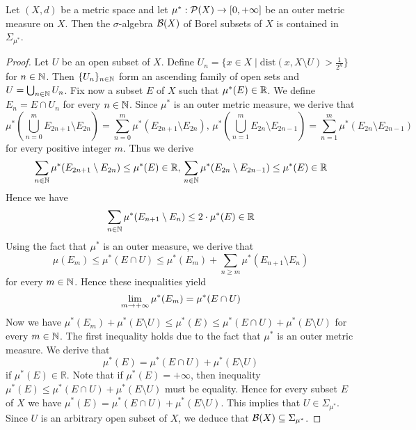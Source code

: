 \begin{theorem}
Let $(X,d)$ be a metric space and let $\mu^*:{\mathcal P}(X)\rightarrow [0,+\infty]$ be an outer metric measure on $X$. Then the $\sigma$-algebra ${\mathcal B}(X)$ of Borel subsets of $X$ is contained in $\Sigma_{\mu^*}$.
\end{theorem}
\begin{proof}
Let $U$ be an open subset of $X$. Define $U_n=\big\{x\in X\mid \mathrm{dist}\left(x,X\setminus U\right)>\frac{1}{2^n}\big\}$ for $n\in {\mathbb N}$. Then $\{U_n\}_{n\in {\mathbb N}}$ form an ascending family of open sets and $U=\bigcup_{n\in {\mathbb N}}U_n$. Fix now a subset $E$ of $X$ such that $\mu^*(E)\in {\mathbb R}$. We define $E_n=E\cap U_n$ for every $n\in {\mathbb N}$. Since $\mu^*$ is an outer metric measure, we derive that
$$\mu^*\left(\bigcup_{n=0}^mE_{2n+1}\setminus E_{2n}\right)=\sum_{n=0}^m\mu^*(E_{2n+1}\setminus E_{2n}),\,\mu^*\left(\bigcup_{n=1}^mE_{2n}\setminus E_{2n-1}\right)=\sum_{n=1}^m\mu^*(E_{2n}\setminus E_{2n-1})$$
for every positive integer $m$. Thus we derive 
$$\sum_{n\in {\mathbb N}}\mu^*(E_{2n+1}\setminus E_{2n})\leq \mu^*(E)\in {\mathbb R},\,\sum_{n\in {\mathbb N}}\mu^*(E_{2n}\setminus E_{2n-1})\leq \mu^*(E)\in {\mathbb R}$$
Hence we have
$$\sum_{n\in {\mathbb N}}\mu^*(E_{n+1}\setminus E_{n})\leq 2\cdot \mu^*(E)\in {\mathbb R}$$
Using the fact that $\mu^*$ is an outer measure, we derive that
$$\mu(E_m)\leq \mu^*(E\cap U)\leq \mu^*(E_m)+\sum_{n\geq m}\mu^*(E_{n+1}\setminus E_n)$$
for every $m\in {\mathbb N}$. Hence these inequalities yield
$$\lim_{m\rightarrow +\infty}\mu^*(E_m)=\mu^*(E\cap U)$$
Now we have $\mu^*(E_m)+\mu^*(E\setminus U)\leq \mu^*(E)\leq \mu^*(E\cap U)+\mu^*(E\setminus U)$ for every $m\in {\mathbb N}$. The first inequality holds due to the fact that $\mu^*$ is an outer metric measure. We derive that
$$\mu^*(E)=\mu^*(E\cap U)+\mu^*(E\setminus U)$$
if $\mu^*(E)\in \mathbb{R}$. Note that if $\mu^*(E)=+\infty$, then inequality $\mu^*(E)\leq \mu^*(E\cap U)+\mu^*(E\setminus U)$ must be equality. Hence for every subset $E$ of $X$ we have $\mu^*(E)=\mu^*(E\cap U)+\mu^*(E\setminus U)$. This implies that $U\in \Sigma_{\mu^*}$. Since $U$ is an arbitrary open subset of $X$, we deduce that ${\mathcal B}(X)\subseteq \Sigma_{\mu^*}$.
\end{proof}































































